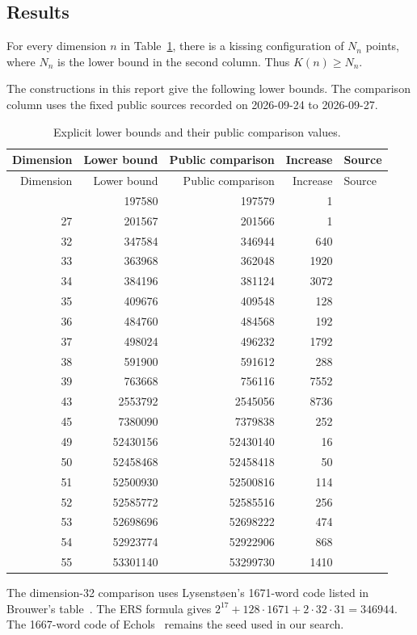 \subsection{Results}

\begin{theorem}\label{thm:main}
For every dimension $n$ in Table~\ref{tab:results}, there is a kissing configuration of $N_n$ points, where $N_n$ is the lower bound in the second column. Thus $K(n)\ge N_n$.
\end{theorem}

The constructions in this report give the following lower bounds. The comparison column uses the fixed public sources recorded on 2026-09-24 to 2026-09-27.

\begin{longtable}{rrrrl}
\caption{Explicit lower bounds and their public comparison values.}\label{tab:results}\\
\toprule
Dimension & Lower bound & Public comparison & Increase & Source\\\midrule
\endfirsthead
\toprule
Dimension & Lower bound & Public comparison & Increase & Source\\\midrule
\endhead
\bottomrule\endfoot
25 & 197580 & 197579 & 1 & \cite{kissingnumbers} \\
27 & 201567 & 201566 & 1 & \cite{lindow27} \\
32 & 347584 & 346944 & 640 & \cite{brouwer} \\
33 & 363968 & 362048 & 1920 & \cite{brouwer} \\
34 & 384196 & 381124 & 3072 & \cite{brouwer} \\
35 & 409676 & 409548 & 128 & \cite{brouwer} \\
36 & 484760 & 484568 & 192 & \cite{brouwer} \\
37 & 498024 & 496232 & 1792 & \cite{brouwer} \\
38 & 591900 & 591612 & 288 & \cite{kissingnumbers} \\
39 & 763668 & 756116 & 7552 & \cite{kissingnumbers} \\
43 & 2553792 & 2545056 & 8736 & \cite{sunwang-sections,crosssections} \\
45 & 7380090 & 7379838 & 252 & \cite{sunwang-sections,crosssections} \\
49 & 52430156 & 52430140 & 16 & \cite{kissingnumbers} \\
50 & 52458468 & 52458418 & 50 & \cite{kissingnumbers} \\
51 & 52500930 & 52500816 & 114 & \cite{kissingnumbers} \\
52 & 52585772 & 52585516 & 256 & \cite{kissingnumbers} \\
53 & 52698696 & 52698222 & 474 & \cite{kissingnumbers} \\
54 & 52923774 & 52922906 & 868 & \cite{kissingnumbers} \\
55 & 53301140 & 53299730 & 1410 & \cite{kissingnumbers} \\
\end{longtable}

The dimension-32 comparison uses Lysenst\o en's 1671-word code listed in
Brouwer's table~\cite{brouwer}. The ERS formula gives
$2^{17}+128\cdot1671+2\cdot32\cdot31=346944$.
The 1667-word code of Echols~\cite{echols} remains the seed used in our search.
